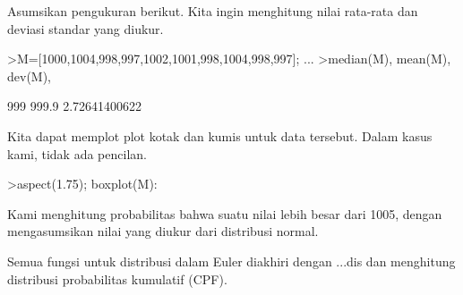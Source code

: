 \documentclass[12pt,Times new roman,letterpaper]{book}
\begin{document}
\begin{eulernootebook}
\begin{eulercomment}
\begin{eulercomment}
\begin{eulernootebook}
\begin{eulercomment}
\begin{eulercomment}
\begin{eulercomment}
\begin{eulercomment}
\begin{eulercomment}
\begin{eulercomment}
\begin{eulercomment}
\begin{eulercomment}
Asumsikan pengukuran berikut. Kita ingin menghitung nilai rata-rata
dan deviasi standar yang diukur.
\end{eulercomment}
\begin{eulerprompt}
>M=[1000,1004,998,997,1002,1001,998,1004,998,997]; ...
>median(M), mean(M), dev(M),
\end{eulerprompt}
\begin{euleroutput}
  999
  999.9
  2.72641400622
\end{euleroutput}
\begin{eulercomment}
Kita dapat memplot plot kotak dan kumis untuk data tersebut. Dalam
kasus kami, tidak ada pencilan.
\end{eulercomment}
\begin{eulerprompt}
>aspect(1.75); boxplot(M):
\end{eulerprompt}
\begin{eulercomment}
Kami menghitung probabilitas bahwa suatu nilai lebih besar dari 1005,
dengan mengasumsikan nilai yang diukur dari distribusi normal.

Semua fungsi untuk distribusi dalam Euler diakhiri dengan ...dis dan
menghitung distribusi probabilitas kumulatif (CPF).


\end{eulercomment}
\end{eulercomment}
\end{eulercomment}
\end{eulercomment}
\end{eulercomment}
\end{eulercomment}
\end{eulercomment}
\end{eulercomment}
\end{eulernootebook}
\end{eulercomment}
\end{eulercomment}
\end{eulernootebook}
\end{document}
